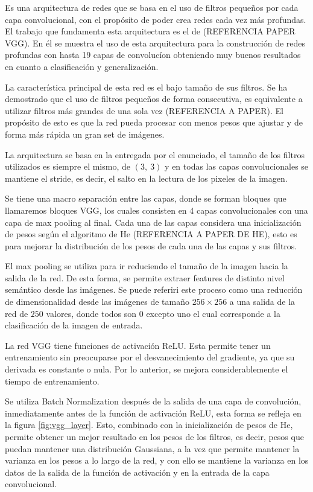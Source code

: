         Es una arquitectura de redes que se basa en el uso de filtros pequeños por cada capa convolucional, con el propósito de poder crea redes cada vez más profundas. El trabajo que fundamenta esta arquitectura es el de (REFERENCIA PAPER VGG). En él se muestra el uso de esta arquitectura para la construcción de redes profundas con hasta 19 capas de convolucíon obteniendo muy buenos resultados en cuanto a clasificación y generalización.
        
        La característica principal de esta red es el bajo tamaño de sus filtros. Se ha demostrado que el uso de filtros pequeños de forma consecutiva, es equivalente a utilizar filtros más grandes de una sola vez (REFERENCIA A PAPER). El propósito de esto es que la red pueda procesar con menos pesos que ajustar y de forma más rápida un gran set de imágenes.
        
        La arquitectura se basa en la entregada por el enunciado, el tamaño de los filtros utilizados es siempre el mismo, de $(3, \ 3)$ y en todas las capas convolucionales se mantiene el stride, es decir, el salto en la lectura de los pixeles de la imagen.
        
        Se tiene una macro separación entre las capas, donde se forman bloques que llamaremos bloques VGG, los cuales consisten en 4 capas convolucionales con una capa de max pooling al final. Cada una de las capas considera una inicialización de pesos según el algoritmo de He (REFERENCIA A PAPER DE HE), esto es para mejorar la distribución de los pesos de cada una de las capas y sus filtros.
        
        El max pooling se utiliza para ir reduciendo el tamaño de la imagen hacia la salida de la red. De esta forma, se permite extraer features de distinto nivel semántico desde las imágenes. Se puede referiri este proceso como una reducción de dimensionalidad desde las imágenes de tamaño $256 \times 256$ a una salida de la red de $250$ valores, donde todos son 0 excepto uno el cual corresponde a la clasificación de la imagen de entrada.
        
        La red VGG tiene funciones de activación ReLU. Esta permite tener un entrenamiento sin preocuparse por el desvanecimiento del gradiente, ya que su derivada es constante o nula. Por lo anterior, se mejora considerablemente el tiempo de entrenamiento.
        
        Se utiliza Batch Normalization después de la salida de una capa de convolución, inmediatamente antes de la función de activación ReLU, esta forma se refleja en la figura \ref{fig:vgg_layer}. Esto, combinado con la inicialización de pesos de He, permite obtener un mejor resultado en los pesos de los filtros, es decir, pesos que puedan mantener una distribución Gaussiana, a la vez que permite mantener la varianza en los pesos a lo largo de la red, y con ello se mantiene la varianza en los datos de la salida de la función de activación y en la entrada de la capa convolucional.
        
